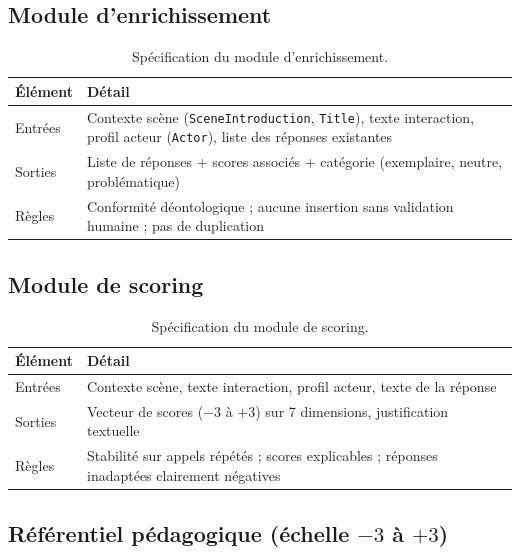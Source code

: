 \subsection{Module d'enrichissement}

\begin{table}[!htbp]
\centering
\small
\begin{tabular}{l p{11cm}}
\toprule
\textbf{\'El\'ement} & \textbf{D\'etail} \\
\midrule
Entr\'ees & Contexte sc\`ene (\texttt{SceneIntroduction}, \texttt{Title}), texte interaction, profil acteur (\texttt{Actor}), liste des r\'eponses existantes \\
Sorties & Liste de r\'eponses + scores associ\'es + cat\'egorie (exemplaire, neutre, probl\'ematique) \\
R\`egles & Conformit\'e d\'eontologique ; aucune insertion sans validation humaine ; pas de duplication \\
\bottomrule
\end{tabular}
\caption{Sp\'ecification du module d'enrichissement.}
\end{table}

\subsection{Module de scoring}

\begin{table}[!htbp]
\centering
\small
\begin{tabular}{l p{11cm}}
\toprule
\textbf{\'El\'ement} & \textbf{D\'etail} \\
\midrule
Entr\'ees & Contexte sc\`ene, texte interaction, profil acteur, texte de la r\'eponse \\
Sorties & Vecteur de scores ($-3$ \`a $+3$) sur 7 dimensions, justification textuelle \\
R\`egles & Stabilit\'e sur appels r\'ep\'et\'es ; scores explicables ; r\'eponses inadapt\'ees clairement n\'egatives \\
\bottomrule
\end{tabular}
\caption{Sp\'ecification du module de scoring.}
\end{table}

\subsection{R\'ef\'erentiel p\'edagogique (\'echelle $-3$ \`a $+3$)}


